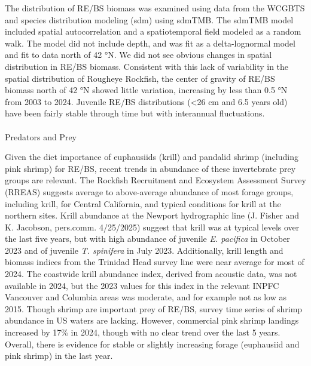 \documentclass[
  english,
]{article}
\makeatletter
\let\oldparagraph\paragraph
\renewcommand{\paragraph}{
    \@ifstar
      \xxxParagraphStar
      \xxxParagraphNoStar
  }
\newcommand{\xxxParagraphStar}[1]{\oldparagraph*{#1}\mbox{}}
\newcommand{\xxxParagraphNoStar}[1]{\oldparagraph{#1}\mbox{}}
\makeatother
\begin{document}
The distribution of RE/BS biomass was examined using data from the
WCGBTS and species distribution modeling (sdm) using sdmTMB. The sdmTMB
model included spatial autocorrelation and a spatiotemporal field
modeled as a random walk. The model did not include depth, and was fit
as a delta-lognormal model and fit to data north of 42 °N. We did not
see obvious changes in spatial distribution in RE/BS biomass. Consistent
with this lack of variability in the spatial distribution of Rougheye
Rockfish, the center of gravity of RE/BS biomass north of 42 °N showed
little variation, increasing by less than 0.5 °N from 2003 to 2024.
Juvenile RE/BS distributions (\textless26 cm and 6.5 years old) have
been fairly stable through time but with interannual fluctuations.

\paragraph{Predators and Prey}\label{predators-and-prey}

Given the diet importance of euphausiids (krill) and pandalid shrimp
(including pink shrimp) for RE/BS, recent trends in abundance of these
invertebrate prey groups are relevant. The Rockfish Recruitment and
Ecosystem Assessment Survey (RREAS) suggests average to above-average
abundance of most forage groups, including krill, for Central
California, and typical conditions for krill at the northern sites.
Krill abundance at the Newport hydrographic line (J. Fisher and K.
Jacobson, pers.comm. 4/25/2025) suggest that krill was at typical levels
over the last five years, but with high abundance of juvenile \emph{E.
pacifica} in October 2023 and of juvenile \emph{T. spinifera} in July
2023. Additionally, krill length and biomass indices from the Trinidad
Head survey line were near average for most of 2024. The coastwide krill
abundance index, derived from acoustic data, was not available in 2024,
but the 2023 values for this index in the relevant INPFC Vancouver and
Columbia areas was moderate, and for example not as low as 2015. Though
shrimp are important prey of RE/BS, survey time series of shrimp
abundance in US waters are lacking. However, commercial pink shrimp
landings increased by 17\% in 2024, though with no clear trend over the
last 5 years. Overall, there is evidence for stable or slightly
increasing forage (euphausiid and pink shrimp) in the last year.
\end{document}

